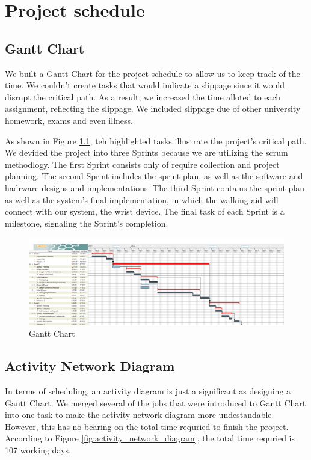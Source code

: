 \chapter{Project schedule}\label{ch:schedule}
    \section{Gantt Chart}

    We built a Gantt Chart for the project schedule to allow us to keep track of the time. We couldn't create tasks that would indicate a slippage since it would disrupt the critical path. As a result, we increased the time alloted to each assignment, reflecting the slippage. We included slippage due of other university homework, exams and even illness.

    As shown in Figure \ref{fig:gantt_chart}, teh highlighted tasks illustrate the project's critical path. We devided the project into three Sprints because we are utilizing the scrum methodlogy. The first Sprint consists only of require collection and project planning. The second Sprint includes the sprint plan, as well as the software and hadrware designs and implementations. The third Sprint contains the sprint plan as well as the system's final implementation, in which the walking aid will connect with our system, the wrist device. The final task of each Sprint is a milestone, signaling the Sprint's completion.

    \begin{figure}[H]
      \includegraphics[width=\linewidth]{graphics/Gantt_Chart.png}
      \caption{Gantt Chart}
      \label{fig:gantt_chart}
    \end{figure}

    \section{Activity Network Diagram}

    In terms of scheduling, an activity diagram is just a significant as designing a Gantt Chart. We merged several of the jobs that were introduced to Gantt Chart into one task to make the activity network diagram more undestandable. However, this has no bearing on the total time requried to finish the project. According to Figure \ref{fig:activity_network_diagram}, the total time requried is 107 working days.

